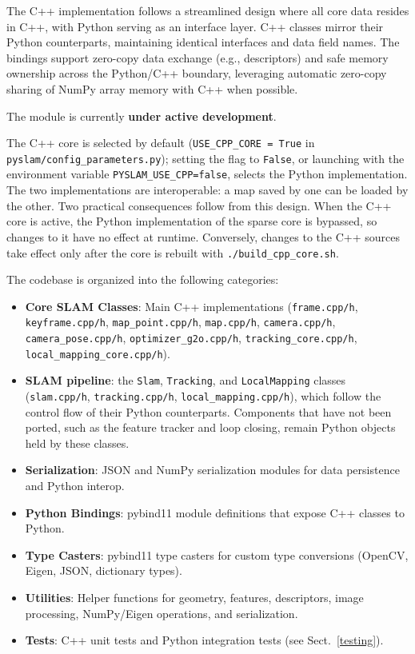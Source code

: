 \documentclass{article}
\begin{document}
The C++ implementation follows a streamlined design where all core data resides in C++, with Python serving as an interface layer. C++ classes mirror their Python counterparts, maintaining identical interfaces and data field names. The bindings support zero-copy data exchange (e.g., descriptors) and safe memory ownership across the Python/C++ boundary, leveraging automatic zero-copy sharing of NumPy array memory with C++ when possible.

The module is currently \textbf{under active development}.

The C++ core is selected by default (\texttt{USE\_CPP\_CORE = True} in \texttt{pyslam/config\_parameters.py}); setting the flag to \texttt{False}, or launching with the environment variable \texttt{PYSLAM\_USE\_CPP=false}, selects the Python implementation. The two implementations are interoperable: a map saved by one can be loaded by the other. Two practical consequences follow from this design. When the C++ core is active, the Python implementation of the sparse core is bypassed, so changes to it have no effect at runtime. Conversely, changes to the C++ sources take effect only after the core is rebuilt with \texttt{./build\_cpp\_core.sh}.


The codebase is organized into the following categories:
\begin{itemize}
\item \textbf{Core SLAM Classes}: Main C++ implementations (\texttt{frame.cpp/h}, \texttt{keyframe.cpp/h}, \texttt{map\_point.cpp/h}, \texttt{map.cpp/h}, \texttt{camera.cpp/h}, \texttt{camera\_pose.cpp/h}, \texttt{optimizer\_g2o.cpp/h}, \texttt{tracking\_core.cpp/h}, \texttt{local\_mapping\_core.cpp/h}).
\item \textbf{SLAM pipeline}: the \texttt{Slam}, \texttt{Tracking}, and \texttt{LocalMapping} classes (\texttt{slam.cpp/h}, \texttt{tracking.cpp/h}, \texttt{local\_mapping.cpp/h}), which follow the control flow of their Python counterparts. Components that have not been ported, such as the feature tracker and loop closing, remain Python objects held by these classes.
\item \textbf{Serialization}: JSON and NumPy serialization modules for data persistence and Python interop.
\item \textbf{Python Bindings}: pybind11 module definitions that expose C++ classes to Python.
\item \textbf{Type Casters}: pybind11 type casters for custom type conversions (OpenCV, Eigen, JSON, dictionary types).
\item \textbf{Utilities}: Helper functions for geometry, features, descriptors, image processing, NumPy/Eigen operations, and serialization.
\item \textbf{Tests}: C++ unit tests and Python integration tests (see Sect.~\ref{testing}).
\end{itemize}
\end{document}
